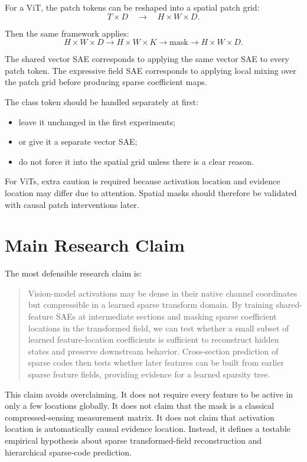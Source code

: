 \documentclass[11pt]{article}
\begin{document}
For a ViT, the patch tokens can be reshaped into a spatial patch grid:
\[
T \times D
\quad\rightarrow\quad
H \times W \times D.
\]

Then the same framework applies:
\[
H \times W \times D
\rightarrow
H \times W \times K
\rightarrow
\text{mask}
\rightarrow
H \times W \times D.
\]

The shared vector SAE corresponds to applying the same vector SAE to every patch token. The expressive field SAE corresponds to applying local mixing over the patch grid before producing sparse coefficient maps.

The class token should be handled separately at first:
\begin{itemize}[leftmargin=*]
    \item leave it unchanged in the first experiments;
    \item or give it a separate vector SAE;
    \item do not force it into the spatial grid unless there is a clear reason.
\end{itemize}

For ViTs, extra caution is required because activation location and evidence location may differ due to attention. Spatial masks should therefore be validated with causal patch interventions later.

\section{Main Research Claim}

The most defensible research claim is:

\begin{quote}
Vision-model activations may be dense in their native channel coordinates but compressible in a learned sparse transform domain. By training shared-feature SAEs at intermediate sections and masking sparse coefficient locations in the transformed field, we can test whether a small subset of learned feature-location coefficients is sufficient to reconstruct hidden states and preserve downstream behavior. Cross-section prediction of sparse codes then tests whether later features can be built from earlier sparse feature fields, providing evidence for a learned sparsity tree.
\end{quote}

This claim avoids overclaiming. It does not require every feature to be active in only a few locations globally. It does not claim that the mask is a classical compressed-sensing measurement matrix. It does not claim that activation location is automatically causal evidence location. Instead, it defines a testable empirical hypothesis about sparse transformed-field reconstruction and hierarchical sparse-code prediction.
\end{document}
